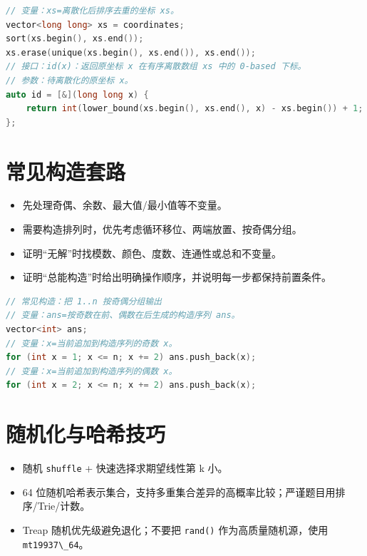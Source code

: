 \begin{lstlisting}[language={C++}]
// 变量：xs=离散化后排序去重的坐标 xs。
vector<long long> xs = coordinates;
sort(xs.begin(), xs.end());
xs.erase(unique(xs.begin(), xs.end()), xs.end());
// 接口：id(x)：返回原坐标 x 在有序离散数组 xs 中的 0-based 下标。
// 参数：待离散化的原坐标 x。
auto id = [&](long long x) {
    return int(lower_bound(xs.begin(), xs.end(), x) - xs.begin()) + 1;
};
\end{lstlisting}

\section{常见构造套路}\label{ux5e38ux89c1ux6784ux9020ux5957ux8def}

\begin{itemize}
\tightlist
\item
  先处理奇偶、余数、最大值/最小值等不变量。
\item
  需要构造排列时，优先考虑循环移位、两端放置、按奇偶分组。
\item
  证明``无解''时找模数、颜色、度数、连通性或总和不变量。
\item
  证明``总能构造''时给出明确操作顺序，并说明每一步都保持前置条件。
\end{itemize}

\begin{lstlisting}[language={C++}]
// 常见构造：把 1..n 按奇偶分组输出
// 变量：ans=按奇数在前、偶数在后生成的构造序列 ans。
vector<int> ans;
// 变量：x=当前追加到构造序列的奇数 x。
for (int x = 1; x <= n; x += 2) ans.push_back(x);
// 变量：x=当前追加到构造序列的偶数 x。
for (int x = 2; x <= n; x += 2) ans.push_back(x);
\end{lstlisting}

\section{随机化与哈希技巧}\label{ux968fux673aux5316ux4e0eux54c8ux5e0cux6280ux5de7}

\begin{itemize}
\tightlist
\item
  随机 \passthrough{\lstinline!shuffle!} + 快速选择求期望线性第 k 小。
\item
  64 位随机哈希表示集合，支持多重集合差异的高概率比较；严谨题目用排序/Trie/计数。
\item
  Treap 随机优先级避免退化；不要把 \passthrough{\lstinline!rand()!} 作为高质量随机源，使用 \passthrough{\lstinline!mt19937\_64!}。
\end{itemize}

